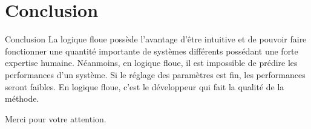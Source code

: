 \documentclass[aspectratio=169,professionalfonts, 12pt]{beamer}
\begin{document}
\section{Conclusion}

\begin{frame}{Conclusion}
  La logique floue possède l'avantage d'être intuitive et de pouvoir faire fonctionner
  une quantité importante de systèmes différents possédant une forte expertise humaine.
  Néanmoins, en logique floue, il est impossible de prédire les performances d'un
  système. Si le réglage des paramètres est fin, les performances seront faibles.
  En logique floue, c'est le développeur qui fait la qualité de la méthode.
\end{frame}

\begin{frame}
  \begin{center}
    Merci pour votre attention.
  \end{center}
\end{frame}
\end{document}
